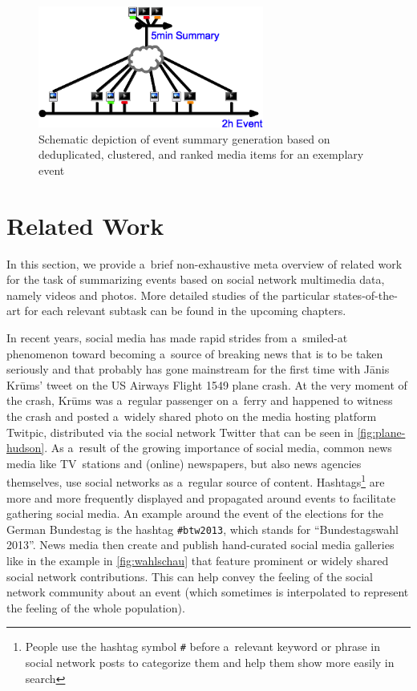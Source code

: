 \begin{figure}[!ht]
  \centering
  \includegraphics[height=4cm]{thesis-diagram.png}
  \caption[Schematic depiction of event summary generation]
    {Schematic depiction of event summary generation
    based on deduplicated, clustered, and ranked media items
    for an exemplary event}
  \label{fig:thesis-diagram}
\end{figure}

\section{Related Work}

In this section, we provide a~brief
non-exhaustive meta overview of related work
for the task of summarizing events
based on social network multimedia data, namely videos and photos.
More detailed studies of the particular states-of-the-art
for each relevant subtask can be found in the upcoming chapters.

In recent years, social media has made rapid strides
from a~smiled-at phenomenon toward
becoming a~source of breaking news that is to be taken seriously
and that probably has gone mainstream for the first time
with J\=anis Kr\=ums' tweet on the US Airways Flight 1549 plane crash.
At the very moment of the crash, Kr\=ums was a~regular passenger on
a~ferry and happened to witness the crash and
posted a~widely shared photo on the media hosting platform Twitpic,
distributed via the social network Twitter
that can be seen in \autoref{fig:plane-hudson}.
As a~result of the growing importance of social media,
common news media like TV~stations and (online) newspapers,
but also news agencies themselves,
use social networks as a~regular source of content.
Hashtags\footnote{People use the hashtag symbol \texttt{\#}
before a~relevant keyword or phrase in social network posts
to categorize them and help them show more easily in search}
are more and more frequently displayed
and propagated around events to facilitate gathering social media.
An example around the event of the elections for the German Bundestag
is the hashtag \texttt{\#btw2013},
which stands for ``Bundestagswahl 2013''.
News media then create and publish hand-curated
social media galleries like in the example in \autoref{fig:wahlschau}
that feature prominent or widely shared social network contributions.
This can help convey the feeling of the social network
community about an event (which sometimes is interpolated
to represent the feeling of the whole population).

